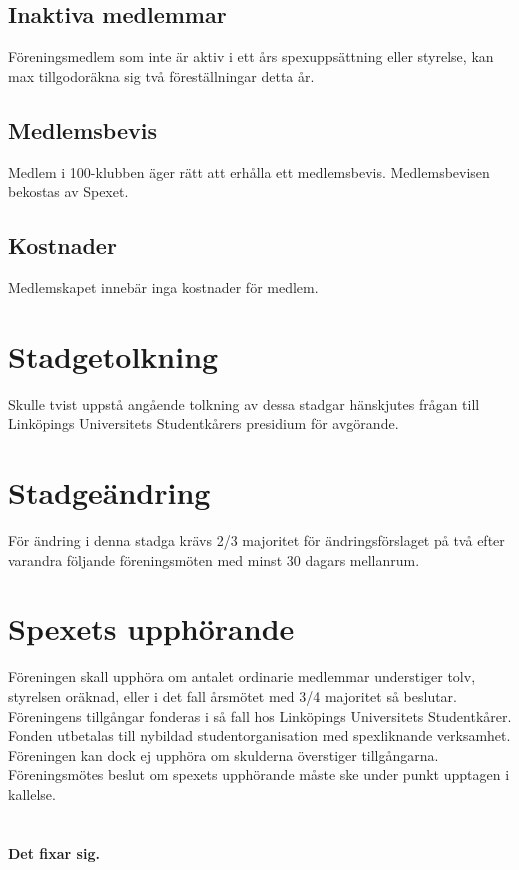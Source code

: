 \documentclass[a4paper]{article}
\begin{document}
\subsection{Inaktiva medlemmar}
Föreningsmedlem som inte är aktiv i ett års spexuppsättning eller styrelse, kan max tillgodoräkna sig två föreställningar detta år.

\subsection{Medlemsbevis}
Medlem i 100-klubben äger rätt att erhålla ett medlemsbevis. Medlemsbevisen bekostas av Spexet.

\subsection{Kostnader}
Medlemskapet innebär inga kostnader för medlem.

\section{Stadgetolkning}
Skulle tvist uppstå angående tolkning av dessa stadgar hänskjutes frågan till Linköpings Universitets Studentkårers presidium för avgörande.

\section{Stadgeändring}
För ändring i denna stadga krävs 2/3 majoritet för ändringsförslaget på två efter varandra följande föreningsmöten med minst 30 dagars mellanrum.

\section{Spexets upphörande}
Föreningen skall upphöra om antalet ordinarie medlemmar understiger tolv, styrelsen oräknad, eller i det fall årsmötet med 3/4 majoritet så beslutar. Föreningens tillgångar fonderas i så fall hos Linköpings Universitets Studentkårer. Fonden utbetalas till nybildad studentorganisation med spexliknande verksamhet. Föreningen kan dock ej upphöra om skulderna överstiger tillgångarna. Föreningsmötes beslut om spexets upphörande måste ske under punkt upptagen i kallelse.

\setcounter{section}{16}
\section{ }
\textbf{Det fixar sig.}
\end{document}
